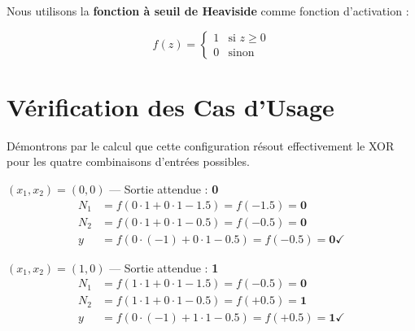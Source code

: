 \documentclass[12pt, a4paper]{article}
\begin{document}
Nous utilisons la \textbf{fonction à seuil de Heaviside} comme fonction d'activation :

\begin{mathbox}
\begin{equation}
    f(z) = \begin{cases} 1 & \text{si } z \geq 0 \\ 0 & \text{sinon} \end{cases}
    \label{eq:heaviside}
\end{equation}
\end{mathbox}

\section{Vérification des Cas d'Usage}

Démontrons par le calcul que cette configuration résout effectivement le XOR
pour les quatre combinaisons d'entrées possibles.

\begin{casebox}{$(x_1, x_2) = (0, 0)$ — Sortie attendue : \textbf{0}}
\begin{align*}
    N_1 &= f\!\left(0 \cdot 1 + 0 \cdot 1 - 1.5\right) = f(-1.5) = \mathbf{0} \\
    N_2 &= f\!\left(0 \cdot 1 + 0 \cdot 1 - 0.5\right) = f(-0.5) = \mathbf{0} \\
    y   &= f\!\left(0 \cdot (-1) + 0 \cdot 1 - 0.5\right) = f(-0.5) = \mathbf{0} \checkmark
\end{align*}
\end{casebox}

\vspace{0.5cm}

\begin{casebox}{$(x_1, x_2) = (1, 0)$ — Sortie attendue : \textbf{1}}
\begin{align*}
    N_1 &= f\!\left(1 \cdot 1 + 0 \cdot 1 - 1.5\right) = f(-0.5) = \mathbf{0} \\
    N_2 &= f\!\left(1 \cdot 1 + 0 \cdot 1 - 0.5\right) = f(+0.5) = \mathbf{1} \\
    y   &= f\!\left(0 \cdot (-1) + 1 \cdot 1 - 0.5\right) = f(+0.5) = \mathbf{1} \checkmark
\end{align*}
\end{casebox}
\end{document}
